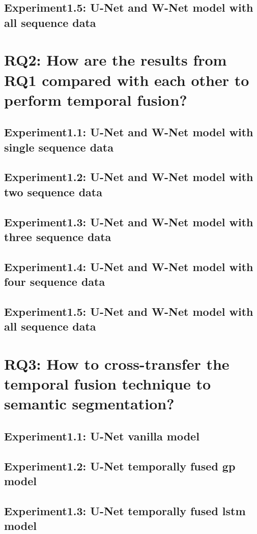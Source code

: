     \subsection{Experiment1.5: U-Net and W-Net model with all sequence data}
    \section{RQ2: How are the results from RQ1 compared with each other to perform temporal fusion?}
    \subsection{Experiment1.1: U-Net and W-Net model with single sequence data}
    \subsection{Experiment1.2: U-Net and W-Net model with two sequence data}
    \subsection{Experiment1.3: U-Net and W-Net model with three sequence data}
    \subsection{Experiment1.4: U-Net and W-Net model with four sequence data}
    \subsection{Experiment1.5: U-Net and W-Net model with all sequence data}
    \section{RQ3: How to cross-transfer the temporal fusion technique to semantic segmentation?}
    \subsection{Experiment1.1: U-Net vanilla model}
    \subsection{Experiment1.2: U-Net temporally fused gp model}
    \subsection{Experiment1.3: U-Net temporally fused lstm model}
    

